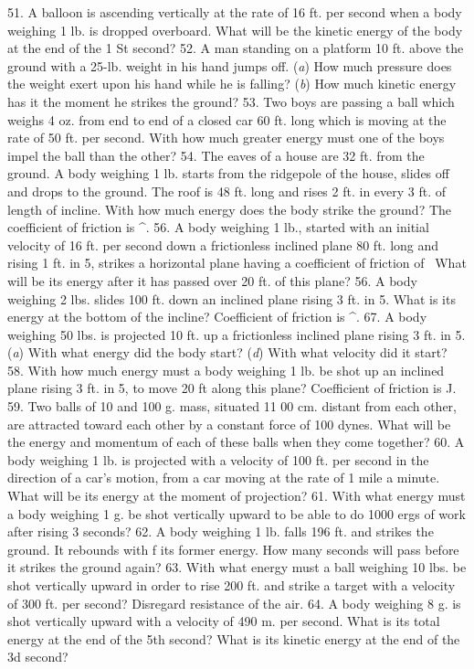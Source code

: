 51. A balloon is ascending vertically at the rate of 16 ft. per second when a body weighing 1 lb. is dropped overboard. What will be the kinetic energy of the body at the end of the 1 St second?
52. A man standing on a platform 10 ft. above the ground with a 25-lb. weight in his hand jumps off. (\emph{a}) How much pressure does the weight exert upon his hand while he is falling? (\emph{b}) How much kinetic energy has it the moment he strikes the ground?
53. Two boys are passing a ball which weighs 4 oz. from end to end of a closed car 60 ft. long which is moving at the rate of 50 ft. per second. With how much greater energy must one of the boys impel the ball than the other?
54. The eaves of a house are 32 ft. from the ground. A body weighing 1 lb. starts from the ridgepole of the house, slides off and drops to the ground. The roof is 48 ft. long and rises 2 ft. in every 3 ft. of length of incline. With how much energy does the body strike the ground? The coefficient of friction is ^.
56. A body weighing 1 lb., started with an initial velocity of 16 ft. per second down a frictionless inclined plane 80 ft. long and rising 1 ft. in 5, strikes a horizontal plane having a coefficient of friction of \, What will be its energy after it has passed over 20 ft. of this plane?
56. A body weighing 2 lbs. slides 100 ft. down an inclined plane rising 3 ft. in 5. What is its energy at the bottom of the incline? Coefficient of friction is ^.
67. A body weighing 50 lbs. is projected 10 ft. up a frictionless inclined plane rising 3 ft. in 5. (\emph{a}) With what energy did the body start? (\emph{d}) With what velocity did it start?
58. With how much energy must a body weighing 1 lb. be shot up an inclined plane rising 3 ft. in 5, to move 20 ft along this plane? Coefficient of friction is J.
59. Two balls of 10 and 100 g. mass, situated 11 00 cm. distant from each other, are attracted toward each other by a constant force of 100 dynes. What will be the energy and momentum of each of these balls when they come together?
60. A body weighing 1 lb. is projected with a velocity of 100 ft. per second in the direction of a car's motion, from a car moving at the rate of 1 mile a minute. What will be its energy at the moment of projection?
61. With what energy must a body weighing 1 g. be shot vertically upward to be able to do 1000 ergs of work after rising 3 seconds?
62. A body weighing 1 lb. falls 196 ft. and strikes the ground. It rebounds with f its former energy. How many seconds will pass before it strikes the ground again?
63. With what energy must a ball weighing 10 lbs. be shot vertically upward in order to rise 200 ft. and strike a target with a velocity of 300 ft. per second? Disregard resistance of the air.
64. A body weighing 8 g. is shot vertically upward with a velocity of 490 m. per second. What is its total energy at the end of the 5th second? What is its kinetic energy at the end of the 3d second?